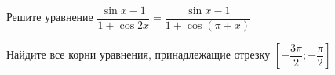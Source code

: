 \begin{ex}
	\begin{condition}
		\begin{enumcols}[label=\asbuk*)]
			\item Решите уравнение \( \dfrac{\sin x -1}{1 + \cos 2x}=\dfrac{\sin x - 1}{1 + \cos{(\pi+x)}} \)
			\item Найдите все корни уравнения, принадлежащие отрезку \( \left[-\dfrac{3\pi}{2};-\dfrac{\pi}{2}\right] \)
		\end{enumcols}
	\end{condition}
\end{ex}